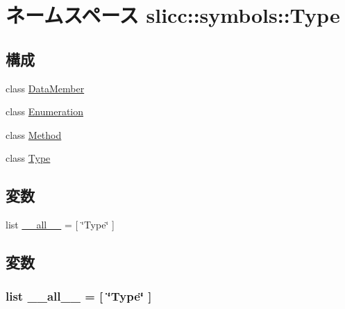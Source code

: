 \hypertarget{namespaceslicc_1_1symbols_1_1Type}{
\section{ネームスペース slicc::symbols::Type}
\label{namespaceslicc_1_1symbols_1_1Type}
}
\subsection*{構成}
\begin{DoxyCompactItemize}
\item 
class \hyperlink{classslicc_1_1symbols_1_1Type_1_1DataMember}{DataMember}
\item 
class \hyperlink{classslicc_1_1symbols_1_1Type_1_1Enumeration}{Enumeration}
\item 
class \hyperlink{classslicc_1_1symbols_1_1Type_1_1Method}{Method}
\item 
class \hyperlink{classslicc_1_1symbols_1_1Type_1_1Type}{Type}
\end{DoxyCompactItemize}
\subsection*{変数}
\begin{DoxyCompactItemize}
\item 
list \hyperlink{namespaceslicc_1_1symbols_1_1Type_aa4a022e6ddacd362b83964da5cc5d044}{\_\-\_\-all\_\-\_\-} = \mbox{[} \char`\"{}Type\char`\"{} \mbox{]}
\end{DoxyCompactItemize}


\subsection{変数}
\hypertarget{namespaceslicc_1_1symbols_1_1Type_aa4a022e6ddacd362b83964da5cc5d044}{
\subsubsection[{\_\-\_\-all\_\-\_\-}]{\setlength{\rightskip}{0pt plus 5cm}list {\bf \_\-\_\-all\_\-\_\-} = \mbox{[} \char`\"{}Type\char`\"{} \mbox{]}}}
\label{namespaceslicc_1_1symbols_1_1Type_aa4a022e6ddacd362b83964da5cc5d044}
